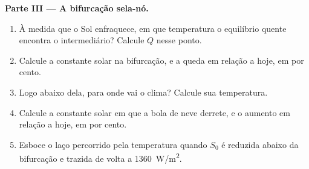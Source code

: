 \begin{problem}
\medskip\noindent\textbf{Parte III --- A bifurcação sela-nó.}
\begin{enumerate}[resume]
\item À medida que o Sol enfraquece, em que temperatura o equilíbrio quente encontra
  o intermediário? Calcule $Q$ nesse ponto.
\item Calcule a constante solar na bifurcação, e a queda em relação a
  hoje, em por cento.
\item Logo abaixo dela, para onde vai o clima? Calcule sua temperatura.
\item Calcule a constante solar em que a bola de neve derrete, e o aumento em relação a
  hoje, em por cento.
\item Esboce o laço percorrido pela temperatura quando $S_0$ é reduzida
  abaixo da bifurcação e trazida de volta a \qty{1360}{W/m^2}.
\end{enumerate}


\end{problem}
